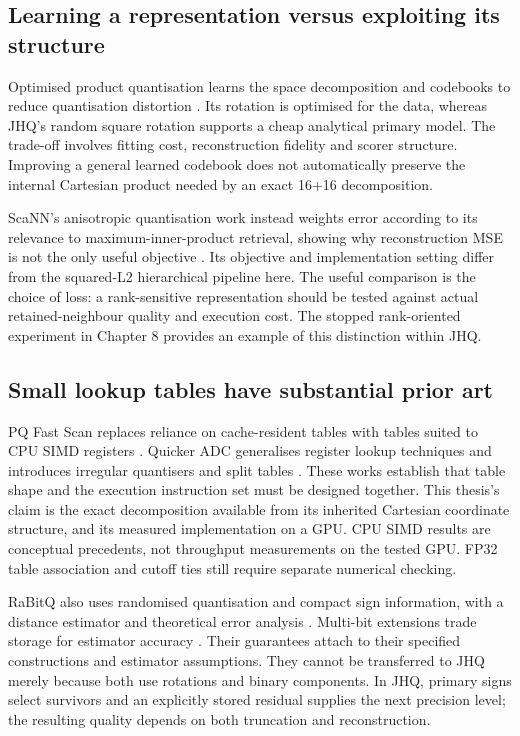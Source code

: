 \subsection{Learning a representation versus exploiting its structure}

Optimised product quantisation learns the space decomposition and codebooks
to reduce quantisation distortion \cite{opq}. Its rotation is optimised for
the data, whereas JHQ's random square rotation supports a cheap analytical
primary model. The trade-off involves fitting cost, reconstruction fidelity
and scorer structure. Improving a general learned codebook does not
automatically preserve the internal Cartesian product needed by an exact
16+16 decomposition.

ScaNN's anisotropic quantisation work instead weights error according to
its relevance to maximum-inner-product retrieval, showing why reconstruction
MSE is not the only useful objective \cite{scann}. Its objective and
implementation setting differ from the squared-L2 hierarchical pipeline
here. The useful comparison is the choice of loss: a rank-sensitive
representation should be tested against actual retained-neighbour quality
and execution cost. The stopped rank-oriented experiment in Chapter 8
provides an example of this distinction within JHQ.

\subsection{Small lookup tables have substantial prior art}

PQ Fast Scan replaces reliance on cache-resident tables with tables suited
to CPU SIMD registers \cite{fastscan}. Quicker ADC generalises register
lookup techniques and introduces irregular quantisers and split tables
\cite{quickeradc}. These works establish that table shape and the execution
instruction set must be designed together. This thesis's claim is the exact
decomposition available from its inherited Cartesian coordinate structure,
and its measured implementation on a GPU. CPU SIMD results are conceptual
precedents, not throughput measurements on the tested GPU. FP32 table
association and cutoff ties still require separate numerical checking.

RaBitQ also uses randomised quantisation and compact sign information,
with a distance estimator and theoretical error analysis
\cite{rabitq}. Multi-bit extensions trade storage for estimator accuracy
\cite{rabitq_multi}. Their guarantees attach to their specified constructions
and estimator assumptions. They cannot be transferred to JHQ merely because
both use rotations and binary components. In JHQ, primary signs select
survivors and an explicitly stored residual supplies the next precision
level; the resulting quality depends on both truncation and reconstruction.

